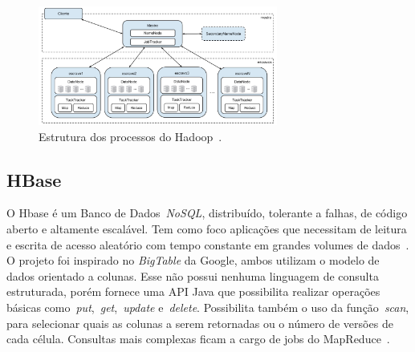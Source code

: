 \documentclass[12pt]{article}
\begin{document}
\begin{figure}[!ht]
\centering
\includegraphics[width=0.7\textwidth]{images/hadoop.png}
\caption{Estrutura dos processos do Hadoop~\cite{goldman2012apache}.}
\label{figure:hadoop}
\end{figure}




\subsection{HBase}
\label{subsec:hbase}

O Hbase é um Banco de Dados~\textit{NoSQL}, distribuído, tolerante a falhas, de código aberto e altamente escalável. Tem como foco aplicações que necessitam de leitura e escrita de acesso aleatório com tempo constante em grandes volumes de dados~\cite{hadoophbase}. O projeto foi inspirado no \textit{BigTable} da Google, ambos utilizam o modelo de dados orientado a colunas. Esse não possui nenhuma linguagem de consulta estruturada, porém fornece uma API Java que possibilita realizar operações básicas como~\emph{put},~\emph{get},~\emph{update} e~\emph{delete}. Possibilita também o uso da função~\emph{scan}, para selecionar quais as colunas a serem retornadas ou o número de versões de cada célula. Consultas mais complexas ficam a cargo de jobs do MapReduce~\cite{cunha2015column}.
\end{document}
